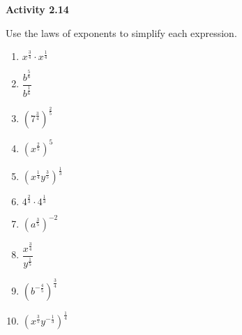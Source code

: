 \vspace{0.3ex}
\noindent\textbf{Activity 2.14}

\vspace{0.2ex}

Use the laws of exponents to simplify each expression.


\begin{multicols}{2}
\begin{enumerate}[noitemsep, label = \color{blue}\arabic*. ]
    \item $x^{\tfrac{3}{4}} \cdot x^{\tfrac{1}{4}}$
    \item $\dfrac{b^{\tfrac{5}{6}}}{b^{\tfrac{1}{6}}}$
    \item $\left(7^{\tfrac{3}{4}}\right)^{\tfrac{2}{5}}$
    \item $\left(x^{\tfrac{2}{5}}\right)^{5}$
    \item $\left(x^{\tfrac{1}{4}}y^{\tfrac{3}{5}}\right)^{\tfrac{1}{3}}$
    \item $4^{\tfrac{2}{3}} \cdot 4^{\tfrac{1}{3}}$
    \item $\left(a^{\tfrac{3}{5}}\right)^{-2}$
    \item $\dfrac{x^{\tfrac{3}{4}}}{y^{\tfrac{1}{5}}}$
    \item $\left(b^{-\tfrac{4}{5}}\right)^{\tfrac{3}{4}}$
    \item $\left(x^{\tfrac{3}{5}}y^{-\tfrac{1}{3}}\right)^{\tfrac{1}{4}}$
\end{enumerate}
\end{multicols}

